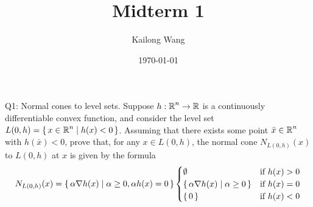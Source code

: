 \documentclass{article}
\title{Midterm 1}
\author{Kailong Wang}
\date{\today}
\begin{document}
\maketitle

\begin{problem}
    {Q1: Normal cones to level sets.}
    Suppose $h:\operatorname{\mathbb{R}}^n\rightarrow\operatorname{\mathbb{R}}$ is a continuously differentiable convex function, and consider the level set $L(0,h)=\left\lbrace\,x\in\operatorname{\mathbb{R}}^n\mid h(x)<0\,\right\rbrace$. Assuming that there exists some point $\bar{x}\in\operatorname{\mathbb{R}}^n$ with $h(\bar{x})<0$, prove that, for any $x\in L(0,h)$, the normal cone $N_{L(0,h)}(x)$ to $L(0,h)$ at $x$ is given by the formula
    \begin{align*}
        N_{L(0,h)}(x)=\left\lbrace\,\alpha\nabla h(x)\mid \alpha\geq 0, \alpha h(x)=0\,\right\rbrace
        \begin{cases}
            \emptyset & \text{if } h(x)>0 \\
            \left\lbrace\,\alpha\nabla h(x)\mid \alpha\geq 0\,\right\rbrace & \text{if } h(x)=0\\
            \left\lbrace\,0\,\right\rbrace & \text{if } h(x)<0
        \end{cases}
    \end{align*}
\end{problem}
\end{document}
